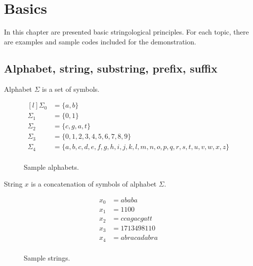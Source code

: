 \chapter{Basics}

In this chapter are presented basic stringological principles. For each topic, there are examples and sample codes included for the demonstration.

\section{Alphabet, string, substring, prefix, suffix}

\begin{dt}{Alphabet}
  $\Sigma$ is a set of symbols.
\end{dt}

\begin{figure}
\begin{equation*}
  \begin{aligned}[l]
    \Sigma_0 &= \{a, b\}\\
    \Sigma_1 &= \{0, 1\}\\
    \Sigma_2 &= \{c, g, a, t\}\\
    \Sigma_3 &= \{0, 1, 2, 3, 4, 5, 6, 7, 8, 9\}\\
    \Sigma_4 &= \{a, b, c, d, e, f, g, h, i, j, k, l, m, n, o, p, q, r, s, t, u, v, w, x, z\}\\
  \end{aligned}
\end{equation*}
\caption{Sample alphabets.}
\end{figure}

\begin{dt}{String}
  $x$ is a concatenation of symbols of alphabet $\Sigma$.
\end{dt}

\begin{figure}
\begin{equation*}
  \begin{aligned}
    x_0 &= ababa\\
    x_1 &= 1100\\
    x_2 &= ccagacgatt\\
    x_3 &= 1713498110\\
    x_4 &= abracadabra\\
  \end{aligned}
\end{equation*}
\caption{Sample strings.}
\end{figure}

